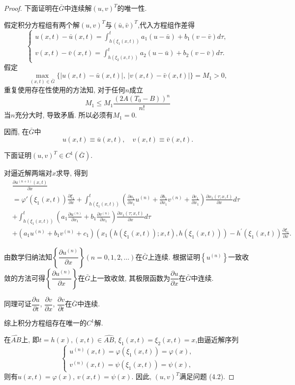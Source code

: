 \begin{proof}
	下面证明在$\bar{G}$中连续解$(u,v)^T$的唯一性.
	
	假定积分方程组有两个解$(u,v)^T$与$(\bar{u},\bar{v})^T$,代入方程组作差得
	$$\begin{cases}
		\displaystyle u(x,t)-\bar{u}(x,t)=\int_{h(\xi_1(x,t))}^ta_1(u-\bar{u})+b_1(v-\bar{v})d\tau,\\
		\displaystyle v(x,t)-\bar{v}(x,t)=\int_{h(\xi_2(x,t))}^ta_2(u-\bar{u})+b_2(v-\bar{v})d\tau.
	\end{cases}$$
	假定
	$$\max_{(x,t)\in\bar{G}}\{|u(x,t)-\bar{u}(x,t)|,\:|v(x,t)-\bar{v}(x,t)|\}=M_{1}>0,$$
	重复使用存在性使用的方法知, 对于任何$n$成立
	$$M_1\leq M_1\frac{(2A(T_0-B))^n}{n!}$$
	当$n$充分大时, 导致矛盾. 所以必须有$M_1=0.$
	
	因而, 在$\bar{G}$中
	$$u(x,t)\equiv\bar{u}(x,t),\quad v(x,t)\equiv\bar{v}(x,t).$$
	
	下面证明$(u,v)^T\in C^1(\bar{G}).$
	
	对逼近解两端对$x$求导, 得到
	$$\begin{aligned}
		&\frac{\partial u^{(n+1)}(x,t)}{\partial x}\\
		&=\varphi'(\xi_{1}(x,t))\frac{\partial\xi_{1}}{\partial x}+\int_{h(\xi_{1}(x,t))}^{t}\left(\frac{\partial a_{1}}{\partial x_{1}}u^{(n)}+\frac{\partial b_{1}}{\partial x_{1}}v^{(n)}+\frac{\partial c_{1}}{\partial x_{1}}\right)\frac{\partial x_{1}(\tau;x,t)}{\partial x}d\tau\\
		&+\int_{h(\xi_{1}(x,t))}^{t}\left(a_{1}\frac{\partial u^{(n)}}{\partial x_{1}}+b_{1}\frac{\partial v^{(n)}}{\partial x_{1}}\right)\frac{\partial x_{1}(\tau;x,t)}{\partial x}d\tau\\
		&+\left(a_1u^{(n)}+b_1v^{(n)}+c_1\right)(x_1(h(\xi_1(x,t));x,t),h(\xi_1(x,t)))-h^{\prime}(\xi_1(x,t))\frac{\partial\xi_1}{\partial x}.
	\end{aligned}$$

	由数学归纳法知$\left\{\dfrac{\partial u^{(n)}}{\partial x}\right\} (n=0, 1, 2, \ldots)$在$\bar{G}$上连续. 根据证明$\left\{u^{(n)}\right\}$一致收敛的方法可得$\left\{\dfrac{\partial u^{(n)}}{\partial x}\right\}$在$\bar G$上一致收敛, 其极限函数为$\dfrac{\partial u}{\partial x}$在$\bar{G}$中连续.
	
	同理可证$\dfrac{\partial u}{\partial t}$, $\dfrac{\partial v}{\partial x}$, $\dfrac{\partial v}{\partial t}$在$\bar{G}$中连续.
	
	综上积分方程组存在唯一的$C^1$解.
	
	在$\widehat{AB}$上, 即$t= h(x), (x,t)\in\widehat{AB}$, $\xi_1(x,t)=\xi_2(x,t)=x$,由逼近解序列
	$$\begin{cases}
		u^{(n)}(x,t)=\varphi(\xi_1(x,t))=\varphi(x),\\
		v^{(n)}(x,t)=\psi(\xi_1(x,t))=\psi(x),
	\end{cases}$$
	则有$u(x,t)=\varphi (x)$, $v(x,t)=\psi (x)$. 因此, $(u,v)^T$满足问题 (4.2).
\end{proof}


